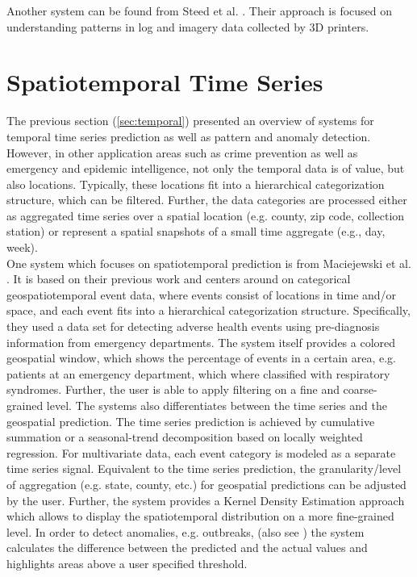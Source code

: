 \documentclass[electronic]{vgtc}             %
\begin{document}
Another system can be found from Steed et al. \cite{steed:2017}.
Their approach is focused on understanding patterns in log and imagery data collected by 3D printers.


\section{Spatiotemporal Time Series\label{sec:spatiotemp}}

\cite{yue:2009}

The previous section (\autoref{sec:temporal}) presented an overview of systems for temporal time series prediction as well as pattern and anomaly detection. 
However, in other application areas such as crime prevention as well as emergency and epidemic intelligence, not only the temporal data is of value, but also locations. 
Typically, these locations fit into a hierarchical categorization structure, which can be filtered.
Further, the data categories are processed either as aggregated time series over a spatial location (e.g. county, zip code, collection station) or represent a spatial snapshots of a small time aggregate (e.g., day, week).\\
One system which focuses on spatiotemporal prediction is from Maciejewski et al. \cite{maciejewski:2011}.
It is based on their previous work \cite{maciejewski:2008, maciejewski:2007} and centers around on categorical geospatiotemporal event data, where events consist of locations
in time and/or space, and each event fits into a hierarchical categorization structure.
Specifically, they used a data set for detecting adverse health events using pre-diagnosis information from emergency departments.
The system itself provides a colored geospatial window, which shows the percentage of events in a certain area, e.g. patients at an emergency department, which where classified with respiratory syndromes.
Further, the user is able to apply filtering on a fine and coarse-grained level. 
The systems also differentiates between the time series and the geospatial prediction.
The time series prediction is achieved by cumulative summation or a seasonal-trend decomposition based on locally weighted regression.
For multivariate data, each event category is modeled as a separate time series signal. 
Equivalent to the time series prediction, the granularity/level of aggregation (e.g. state, county, etc.) for geospatial predictions can be adjusted by the user.
Further, the system provides a Kernel Density Estimation approach which allows to display the spatiotemporal distribution on a more fine-grained level.
In order to detect anomalies, e.g. outbreaks, (also see ) the system calculates the difference between the predicted and the actual values and highlights areas above a user specified threshold.
\end{document}
